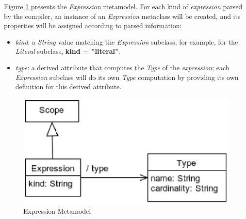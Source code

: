 Figure \ref{fig:meta:expression} presents the \emph{Expression} metamodel.
For each kind of \emph{expression} parsed by the compiler,
an instance of an \emph{Expression} metaclass will be created,
and its properties will be assigned
according to parsed information:

\begin{itemize}

\item \emph{kind}:
a \emph{String} value matching the \emph{Expression} subclass;
for example, for the \emph{Literal} subclass, \textbf{kind = "literal"}.

\item \emph{type}:
a derived attribute that computes the \emph{Type} of the \emph{expression};
each \emph{Expression} subclass will do its own \emph{Type} computation
by providing its own definition for this derived attribute.

\end{itemize}

\begin{figure}[H]
\includegraphics[width=\textwidth]{metamodel/expression}
\caption{Expression Metamodel}
\label{fig:meta:expression}
\end{figure}
